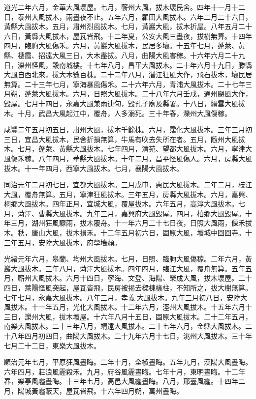 \begin{pinyinscope}
道光二年六月，金華大風壞屋。七月，蘄州大風，拔木壞民舍。四年十一月十二日，泰州大風拔木，兩晝夜不止。五年六月，羅田大風拔木。六年二月二十六日，黃縣大風拔木。五月，肅州烈風拔木。七月，黃巖大風，拔木折屋。八年五月二十六日，黃縣大風拔木，屋瓦皆飛。十二年夏，公安大風三晝夜，拔樹無算。十四年四月，臨朐大風傷禾。六月，黃巖大風拔木，民居多壞。十五年七月，蓬萊、黃縣、棲霞、招遠大風三日，大木盡拔。八月，曲陽大風害稼。十六年六月二十九日，灤州怪風，毀南城樓。十七年八月，昌平大風拔木。二十年六月十九日，滕縣大風自西北來，拔大木數百株。二十二年八月，潛江狂風大作，飛石拔木，壞民居無算。二十三年七月，寧海暴風傷禾。二十六年六月，青浦大風拔木。二十七年三月朔，蓬萊大風拔木。六月，日照大風拔木。二十八年六月壬戌，通州颶風大作，毀屋。七月十四日，永嘉大風兼雨連旬，毀孔子廟及縣署。十八日，縉雲大風拔木。十月，武昌大風起江中，覆舟，人多溺死。三十年春，灤州大風傷稼。

咸豐二年五月初五日，肅州大風，拔木千餘株。六月，霑化大風拔木。三年三月初三日，宜昌大風拔木，民舍折損無算，牛馬有吹去失所在者。五月，隨州大風拔木。七月，蓬萊、黃縣大風拔木。七年四月，清苑、望都大風拔木。六月，寧津大風傷禾稼。八年四月，華縣大風拔木。十年二月，昌平怪風傷人。六月，房縣大風拔木。十一年四月，西寧大風拔木。七月，襄陽大風拔木。

同治元年二月初七日，宜都大風拔木。三月戊申，惠民大風拔木。二年二月，枝江大風，覆舟無算。五月，寧津狂風拔木。三年五月，房縣大風拔木。六月，嘉興、桐鄉大風拔木。四年正月，宜城大風，覆屋拔木。六年五月，高淳大風拔木。七月，菏澤、曹縣大風拔木。九年三月，嘉興府大風毀屋。四月，柏鄉大風毀屋。十年三月，湖州狂風驟雨，拔木覆舟。十一年六月二十七日夜，日照大風雨，偃禾拔木。秋，唐山大風，拔木損禾。十二年五月初六日，固原大風，壞城中回回寺。十三年五月，安陸大風拔木，府學墻頹。

光緒元年六月，皋蘭、均州大風拔木。七月，日照、臨朐大風傷稼。二年六月，黃巖大風拔木。三年八月，菏澤大風拔木。四年四月，臨江大風，覆舟無算。五年五月，蘄州大風拔木。六月十四日，寧海、文登、海陽、榮成大風，拔木壞屋。二十四日，萊陽怪風突起，屋瓦皆飛，民房被揭去樑棟椽柱，不知所之，拔大樹無算。七年七月，永嘉大風拔木。八年三月，孝義大風拔木。九年三月初八日，安陸大風拔木。十一年五月，光化大風拔木。十二年六月，涇州大風拔木。十五年六月十三日，灤州大風，拔木壞屋。十六年八月十五日，固原大風拔木。二十二年五月，南樂大風拔木。二十三年八月，靖遠大風拔木。二十七年六月，金縣大風拔木。二十八年四月初四日，曲陽大風拔木。二十九年六月十七日，洮州大風拔木。三十年七月二十二日，東樂大風拔木。

順治元年七月，平原狂風晝晦。二年十月，全椒晝晦。五年九月，漢陽大風晝晦。六年四月，莊浪風霾殺禾。九月，府谷風霾晝晦。七年十月，東明晝晦。十二年春，樂亭風霾晝晦。十三年七月，高邑大風霾晝晦。八月，邢臺風霾。十四年二月，陽城黃霾蔽天，屋瓦皆飛。十六年四月朔，萬州晝晦。


\end{pinyinscope}

